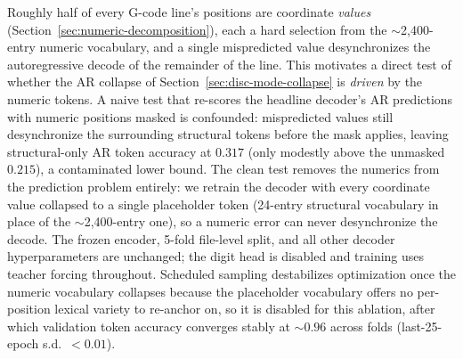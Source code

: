 \documentclass[sensors,article,submit,moreauthors,pdftex]{Definitions/mdpi}
\begin{document}
Roughly half of every G-code line's positions are coordinate \emph{values} (Section~\ref{sec:numeric-decomposition}), each a hard selection from the $\sim$2{,}400-entry numeric vocabulary, and a single mispredicted value desynchronizes the autoregressive decode of the remainder of the line. This motivates a direct test of whether the AR collapse of Section~\ref{sec:disc-mode-collapse} is \emph{driven} by the numeric tokens. A naive test that re-scores the headline decoder's AR predictions with numeric positions masked is confounded: mispredicted values still desynchronize the surrounding structural tokens before the mask applies, leaving structural-only AR token accuracy at $0.317$ (only modestly above the unmasked $0.215$), a contaminated lower bound. The clean test removes the numerics from the prediction problem entirely: we retrain the decoder with every coordinate value collapsed to a single placeholder token (24-entry structural vocabulary in place of the $\sim$2{,}400-entry one), so a numeric error can never desynchronize the decode. The frozen encoder, 5-fold file-level split, and all other decoder hyperparameters are unchanged; the digit head is disabled and training uses teacher forcing throughout. Scheduled sampling destabilizes optimization once the numeric vocabulary collapses because the placeholder vocabulary offers no per-position lexical variety to re-anchor on, so it is disabled for this ablation, after which validation token accuracy converges stably at $\sim$$0.96$ across folds (last-25-epoch s.d.\ $<\!0.01$).
\end{document}
